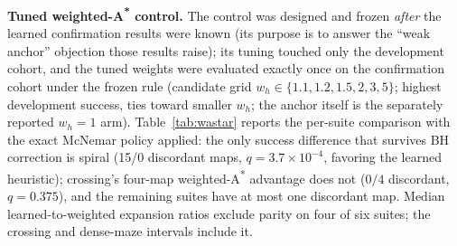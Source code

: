 \documentclass[letterpaper]{article} %
\begin{document}
\textbf{Tuned weighted-A\textsuperscript{*} control.} The control was designed and frozen \emph{after} the learned confirmation results were known (its purpose is to answer the ``weak anchor'' objection those results raise); its tuning touched only the development cohort, and the tuned weights were evaluated exactly once on the confirmation cohort under the frozen rule (candidate grid $w_h \in \{1.1, 1.2, 1.5, 2, 3, 5\}$; highest development success, ties toward smaller $w_h$; the anchor itself is the separately reported $w_h{=}1$ arm). Table~\ref{tab:wastar} reports the per-suite comparison with the exact McNemar policy applied: the only success difference that survives BH correction is spiral (15/0 discordant maps, $q{=}3.7{\times}10^{-4}$, favoring the learned heuristic); crossing's four-map weighted-A\textsuperscript{*} advantage does not ($0/4$ discordant, $q{=}0.375$), and the remaining suites have at most one discordant map. Median learned-to-weighted expansion ratios exclude parity on four of six suites; the crossing and dense-maze intervals include it.
\end{document}
